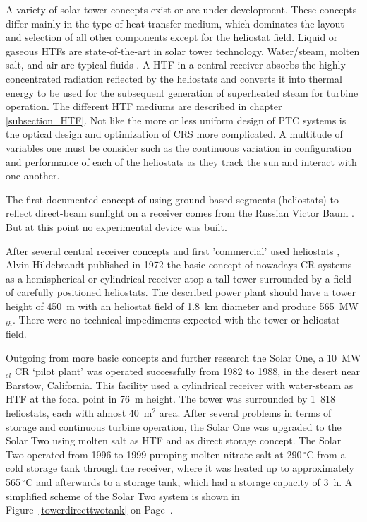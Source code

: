 A variety of solar tower concepts exist or are under development. These concepts differ mainly in the type of heat transfer medium, which dominates the layout and selection of all other components except for the heliostat field. Liquid or gaseous HTFs are state-of-the-art in solar tower technology. Water/steam, molten salt, and air are typical fluids \cite{Pitz-Paal.2013}. A HTF in a central receiver absorbs the highly concentrated radiation reflected by the heliostats and converts it into thermal energy to be used for the subsequent generation of superheated steam for turbine operation. The different HTF mediums are described in  chapter \ref{subsection_HTF}. Not like the more or less uniform design of PTC systems is the optical design and optimization of CRS more complicated. A multitude of variables one must be consider such as the continuous variation in configuration and performance of each of the heliostats as they track the sun and interact with one another. 

The first documented concept of using ground-based segments (heliostats) to reflect direct-beam sunlight on a receiver comes from the Russian Victor Baum \cite{Baum1957}. But at this point no experimental device was built.

After several central receiver concepts and first 'commercial' used heliostats \cite{Trombe1957}, Alvin Hildebrandt published in 1972 the basic concept of nowadays CR systems as a hemispherical or cylindrical receiver atop a tall tower surrounded by a field of carefully positioned heliostats. The described power plant should have a tower height of 450~m with an heliostat field of 1.8~km diameter and produce 565~MW$_{th}$. There were no technical impediments expected with the tower or heliostat field. \cite{Hildebrandt1972}

Outgoing from more basic concepts and further research the Solar One, a 10~MW$_{el}$ CR ‘pilot plant’ was operated successfully from 1982 to 1988, in the desert near Barstow, California. This facility used a cylindrical receiver with water-steam as HTF at the focal point in 76~m height. The tower was surrounded by 1~818 heliostats, each with almost 40~m$^2$ area. After several problems in terms of storage and continuous turbine operation, the Solar One was upgraded to the Solar Two using molten salt as HTF and as direct storage concept. The Solar Two operated from 1996 to 1999 pumping molten nitrate salt at 290$\,^{\circ}\mathrm{C}$ from a cold storage tank through the receiver, where it was heated up to approximately 565$\,^{\circ}\mathrm{C}$ and afterwards to a storage tank, which had a storage capacity of 3~h. A simplified scheme of the Solar Two system is shown in Figure~\ref{towerdirecttwotank} on Page~\pageref{towerdirecttwotank}. \cite{Reilly2001}

